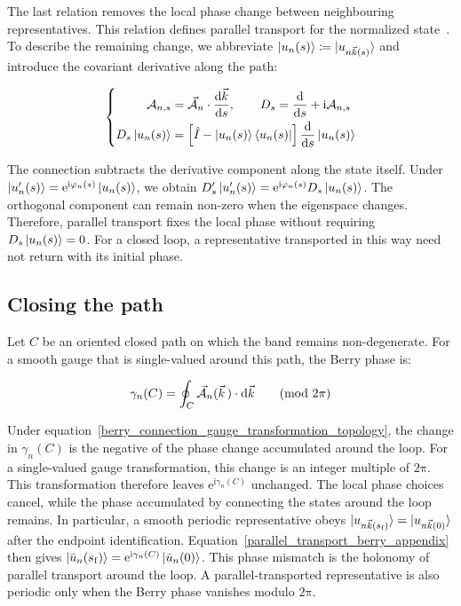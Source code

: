 The last relation removes the local phase change between neighbouring representatives.
This relation defines parallel transport for the normalized state~\cite{xiao2010berry}.
To describe the remaining change, we abbreviate $\ket{u_n(s)}\coloneqq\ket{u_{n\vec{k}(s)}}$
and introduce the covariant derivative along the path:

\begin{equation}
\left\{\begin{aligned}
    \mathcal{A}_{n,s}&=\vec{\mathcal{A}}_n\cdot\frac{\mathrm{d}\vec{k}}{\mathrm{d} s},
    \qquad D_s=\frac{\mathrm{d}}{\mathrm{d} s}+\mathrm{i}\mathcal{A}_{n,s} \\
    D_s\ket{u_n(s)}
    &=\left[\hat{I}-\ket{u_n(s)}\bra{u_n(s)}\right]
    \frac{\mathrm{d}}{\mathrm{d} s}\ket{u_n(s)}
\end{aligned}\right.
\label{covariant_state_derivative_appendix}
\end{equation}

The connection subtracts the derivative component along the state itself.
Under $\ket{u'_n(s)}=\mathrm{e}^{\mathrm{i}\varphi_n(s)}\ket{u_n(s)}$,
we obtain $D'_s\ket{u'_n(s)}=\mathrm{e}^{\mathrm{i}\varphi_n(s)}D_s\ket{u_n(s)}$.
The orthogonal component can remain non-zero when the eigenspace changes.
Therefore, parallel transport fixes the local phase without requiring $D_s\ket{u_n(s)}=0$.
For a closed loop, a representative transported in this way need not return with its initial phase.

\subsection{Closing the path}

Let $C$ be an oriented closed path on which the band remains non-degenerate.
For a smooth gauge that is single-valued around this path, the Berry phase is:

\begin{equation}
    \gamma_n(C)
    =\oint_C\vec{\mathcal{A}}_n(\vec{k}\,)\cdot\mathrm{d}\vec{k}
    \qquad (\mathrm{mod}\ 2\mathrm{\pi})
\label{berry_phase_closed_path_topology}
\end{equation}

Under equation~\eqref{berry_connection_gauge_transformation_topology},
the change in $\gamma_n(C)$ is the negative of the phase change accumulated around the loop.
For a single-valued gauge transformation, this change is an integer multiple of $2\mathrm{\pi}$.
This transformation therefore leaves $\mathrm{e}^{\mathrm{i}\gamma_n(C)}$ unchanged.
The local phase choices cancel, while the phase accumulated by connecting the states around the loop remains.
In particular, a smooth periodic representative obeys
$\ket{u_{n\vec{k}(s_\mathrm{f})}}=\ket{u_{n\vec{k}(0)}}$ after the endpoint identification.
Equation~\eqref{parallel_transport_berry_appendix} then gives
$\ket{\bar{u}_n(s_\mathrm{f})}=\mathrm{e}^{\mathrm{i}\gamma_n(C)}\ket{\bar{u}_n(0)}$.
This phase mismatch is the holonomy of parallel transport around the loop.
A parallel-transported representative is also periodic only when the Berry phase vanishes modulo $2\mathrm{\pi}$.

